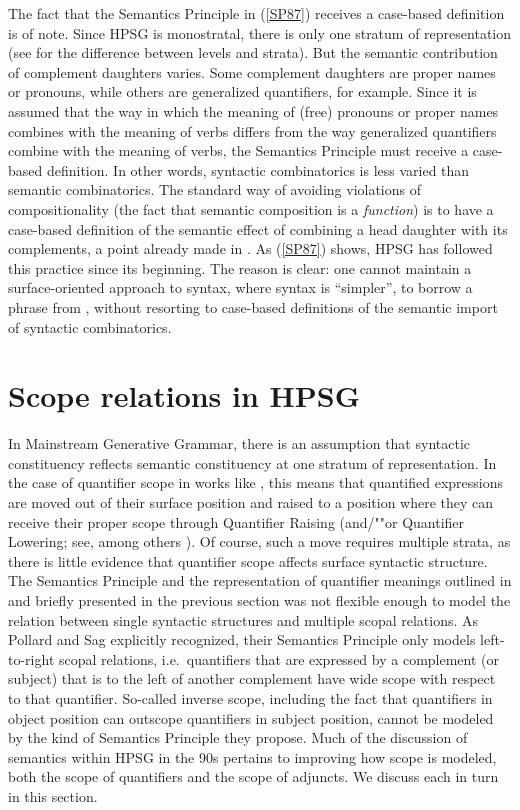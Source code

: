 \documentclass[output=paper
	        ,collection
	        ,collectionchapter
 	        ,biblatex
                ,babelshorthands
                ,newtxmath
                ,draftmode
                ,colorlinks, citecolor=brown
]{langscibook}
\begin{document}

The fact that the Semantics Principle in (\ref{SP87}) receives a case-based definition is of note. Since HPSG is monostratal, there is only one stratum of representation (see \citealt{Ladusaw1988b} for the difference between levels and strata). But the semantic contribution of complement daughters varies. Some complement daughters are proper names or pronouns, while others are generalized quantifiers, for example. Since it is assumed that the way in which the meaning of (free) pronouns or proper names combines with the meaning of verbs  differs from the way generalized quantifiers combine with the meaning of verbs, the Semantics Principle must receive a case-based definition. In other words, syntactic combinatorics is less varied than semantic combinatorics. The standard way of avoiding violations of compositionality (the fact that semantic composition is a \emph{function}) is to have a case-based definition of the semantic effect of combining a head daughter with its complements, a point already made in \citet{Partee1984a}. As (\ref{SP87}) shows, HPSG has followed this practice since its beginning. The reason is clear: one cannot maintain a surface-oriented approach to syntax, where syntax is ``simpler'', to borrow a phrase from \citet{CulicoverandJackendoff2005}, without resorting to case-based definitions of the semantic import of syntactic combinatorics.


\section{Scope relations in HPSG}

In Mainstream Generative Grammar, there is an assumption that syntactic constituency reflects semantic constituency at one stratum of representation. In the case of quantifier scope in works like \citet{May1985}, this means that quantified expressions are moved out of their surface position and raised to a position where they can receive their proper scope through Quantifier Raising (and/""or Quantifier Lowering; see, among others \citealt{Hornstein1995}). Of course, such a move requires multiple strata, as there is little evidence that quantifier scope affects surface syntactic structure. The Semantics Principle and the representation of quantifier meanings outlined in \citet{PollardandSag1987} and briefly presented in the previous section was not flexible enough to model the relation between single syntactic structures and multiple scopal relations. As Pollard and Sag explicitly recognized, their Semantics Principle only models left-to-right scopal relations, i.e.\ quantifiers that are expressed by a complement (or subject) that is to the left of another complement have wide scope with respect to that quantifier. So-called inverse scope, including the fact that quantifiers in object position can outscope quantifiers in subject position, cannot be modeled by the kind of Semantics Principle they propose. Much of the discussion of semantics within HPSG in the 90s pertains to improving how scope is modeled, both the scope of quantifiers and the scope of adjuncts. We discuss each in turn in this section.
\end{document}
